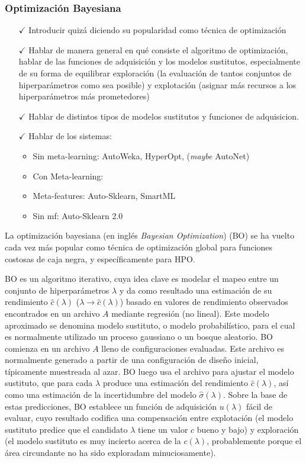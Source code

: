 \subsubsection{Optimización Bayesiana}


\begin{itemize}
	\item[$\checkmark$] Introducir quizá diciendo su popularidad como técnica de optimización
	\item[$\checkmark$] Hablar de manera general en qué consiste el algoritmo de optimización, hablar de las funciones de adquisición y los modelos sustitutos, especialmente de su forma de equilibrar exploración (la evaluación de tantos conjuntos de hiperparámetros como sea posible) y explotación (asignar más recursos a los hiperparámetros más prometedores)
	\item[$\checkmark$] Hablar de distintos tipos de modelos sustitutos y funciones de adquisicion.
	\item[$\checkmark$] Hablar de los sistemas: \begin{itemize}
		\item Sin meta-learning: AutoWeka, HyperOpt, (\textit{maybe} AutoNet)
		\item Con Meta-learning: 
		\item Meta-features: Auto-Sklearn, SmartML 
		\item Sin mf: Auto-Sklearn 2.0
	\end{itemize}
\end{itemize}

La optimización bayesiana (en inglés \textit{Bayesian Optimization}) (BO) se ha vuelto cada vez más popular como técnica de optimización global para funciones costosas de caja negra, y específicamente para HPO.  

BO es un algoritmo iterativo, cuya idea clave es modelar el mapeo entre un conjunto de hiperparámetros $\lambda$ y da como resultado una estimación de su rendimiento $\hat{c}(\lambda)$ ($\lambda \rightarrow \hat{c}(\lambda)$) basado en valores de rendimiento observados encontrados en un archivo $A$ mediante regresión (no lineal). Este modelo aproximado se denomina modelo sustituto, o modelo probabilístico, para el cual es normalmente utilizado un proceso gaussiano o un bosque aleatorio. BO comienza en un archivo $A$ lleno de configuraciones evaluadas. Este archivo es normalmente generado a partir de una configuración de diseño inicial, típicamente muestreada al azar. BO luego usa el archivo para ajustar el modelo sustituto, que para cada $\lambda$ produce una estimación del rendimiento $\hat{c}(\lambda)$, así como una estimación de la incertidumbre del modelo $\hat{\sigma}(\lambda)$. Sobre la base de estas predicciones, BO establece un función de adquisición $u(\lambda)$ fácil de evaluar, cuyo resultado codifica una compensación entre explotación (el modelo sustituto predice que el candidato $\lambda$ tiene un valor $c$ bueno y bajo) y exploración (el modelo sustituto es muy incierto acerca de la $c(\lambda)$, probablemente porque el área circundante no ha sido exploradam minuciosamente).

